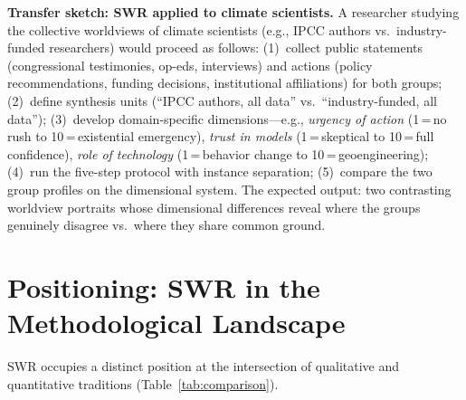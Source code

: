 \documentclass[11pt,a4paper]{article}
\begin{document}
\textbf{Transfer sketch: SWR applied to climate scientists.} A researcher studying the collective worldviews of climate scientists (e.g., IPCC authors vs.\ industry-funded researchers) would proceed as follows: (1)~collect public statements (congressional testimonies, op-eds, interviews) and actions (policy recommendations, funding decisions, institutional affiliations) for both groups; (2)~define synthesis units (``IPCC authors, all data'' vs.\ ``industry-funded, all data''); (3)~develop domain-specific dimensions---e.g., \emph{urgency of action} (1\,=\,no rush to 10\,=\,existential emergency), \emph{trust in models} (1\,=\,skeptical to 10\,=\,full confidence), \emph{role of technology} (1\,=\,behavior change to 10\,=\,geoengineering); (4)~run the five-step protocol with instance separation; (5)~compare the two group profiles on the dimensional system. The expected output: two contrasting worldview portraits whose dimensional differences reveal where the groups genuinely disagree vs.\ where they share common ground.


\section{Positioning: SWR in the Methodological Landscape}
\label{sec:positioning}

SWR occupies a distinct position at the intersection of qualitative and quantitative traditions (Table~\ref{tab:comparison}).
\end{document}
